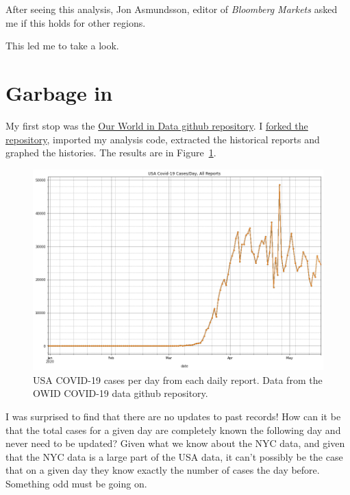 \documentclass[10pt,reqno]{amsart}
\begin{document}
After seeing this analysis, Jon Asmundsson, editor of {\it Bloomberg
  Markets} asked me if this holds for other regions.\cite{Asmundsson2020Dates}

This led me to take a look.

\section{Garbage in}
My first stop was the
\href{https://github.com/owid/covid-19-data}{Our World in Data github
  repository}\nocite{owid2020data}.  I
\href{https://github.com/hjstein/covid-19-data}{forked the
  repository}, imported my analysis code, extracted the historical
reports and graphed the histories.  The results are in Figure~\ref{fig:owid}.

\begin{figure}[!htb]
  \centering
  \includegraphics[width=\textwidth]{../Notebooks/USACasesPerDayRawNoLegend.png}
  \caption{USA COVID-19 cases per day from each daily report.  Data
    from the OWID COVID-19 data github repository.}
  \label{fig:owid}
\end{figure}

I was surprised to find that there are no updates to past records!
How can it be that the total cases for a given day are completely
known the following day and never need to be updated?  Given what we
know about the NYC data, and given that the NYC data is a large part
of the USA data, it can't possibly be the case that on a given day
they know exactly the number of cases the day before.  Something odd
must be going on.
\end{document}
